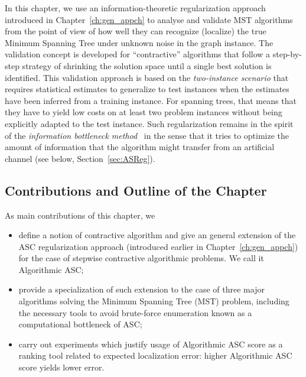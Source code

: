 In this chapter, we use an information-theoretic regularization approach
introduced in Chapter~\ref{ch:gen_appch} to analyse and validate MST algorithms
from the point of view of how well they can recognize (localize) the true
Minimum Spanning Tree under unknown noise in the graph instance. The validation
concept is developed for ``contractive'' algorithms that follow a step-by-step
strategy of shrinking the solution space until a single best solution is
identified.  This validation approach is based on the \emph{two-instance
scenario} \citep{Vapnik:1982} that requires statistical estimates to generalize
to test instances when the estimates have been inferred from a training
instance. For spanning trees, that means that they have to yield low costs on at
least two problem instances without being explicitly adapted to the test
instance.%
Such regularization remains in the spirit of the \emph{information bottleneck
method}~\citep{Tishby:1999} in the sense that it tries to optimize the amount of
information that the algorithm might transfer from an artificial channel (see
below, Section~\ref{sec:ASReg}).


\subsection{Contributions and Outline of the Chapter}
\label{sec:mst_contribs}
As main contributions of this chapter, we
\begin{itemize}
  \item define a notion of contractive algorithm and give an general
  extension of the ASC regularization approach (introduced earlier in
  Chapter~\ref{ch:gen_appch}) for the case of stepwise contractive algorithmic
  problems. We call it Algorithmic ASC;
  \item provide a specialization of such extension to the case of three major
  algorithms solving the Minimum Spanning Tree (MST) problem, including the
  necessary tools to avoid brute-force enumeration known as a computational
  bottleneck of ASC;
  \item carry out experiments which justify usage of Algorithmic ASC score as
  a ranking tool related to expected localization error: higher Algorithmic ASC
  score yields lower error.
\end{itemize}

